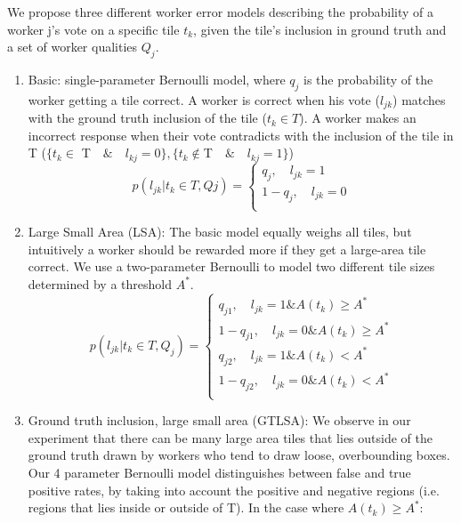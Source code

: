 \par We propose three different worker error models describing the probability of a worker j's vote on a specific tile $t_k$, given the tile's inclusion in ground truth and a set of worker qualities $Q_j$. 
\begin{enumerate}
\item Basic: single-parameter Bernoulli model, where $q_j$ is the probability of the worker getting a tile correct. A worker is correct when his vote ($l_{jk}$) matches with the ground truth inclusion of the tile ($t_k\in T$). A worker makes an incorrect response when their vote contradicts with the inclusion of the tile in T ($\{t_k\in$ T$\quad\&\quad l_{kj}=0\}, \{t_k\notin $T$\quad\&\quad l_{kj}=1\}$)
\begin{equation}
p(l_{jk}|t_k\in T, Qj) = \begin{cases}
               q_j, \quad l_{jk}=1\\
               1-q_j, \quad l_{jk}=0\\
            \end{cases}
\end{equation}
\item Large Small Area (LSA): The basic model equally weighs all tiles, but intuitively a worker should be rewarded more if they get a large-area tile correct. We use a two-parameter Bernoulli to model two different tile sizes determined by a threshold $A^*$.
\begin{equation}
p(l_{jk}|t_k\in T,Q_j) = \begin{cases}
               q_{j1}, \quad l_{jk}=1 \& A(t_k)\geq A^*\\
               1-q_{j1}, \quad l_{jk}=0 \& A(t_k)\geq A^*\\
                q_{j2}, \quad l_{jk}=1 \& A(t_k)< A^*\\
               1-q_{j2}, \quad l_{jk}=0 \& A(t_k)< A^*\\
            \end{cases}
\end{equation}
\item Ground truth inclusion, large small area (GTLSA): We observe in our experiment that there can be many large area tiles that lies outside of the ground truth drawn by workers who tend to draw loose, overbounding boxes. Our 4 parameter Bernoulli model distinguishes between false and true positive rates, by taking into account the positive and negative regions (i.e. regions that lies inside or outside of T). 
In the case where $A(t_k)\geq A^*$: 

\end{enumerate}
